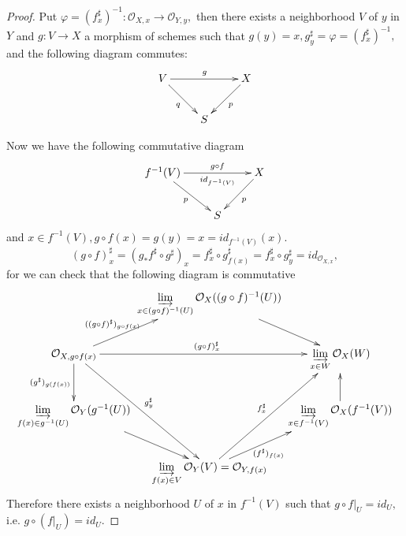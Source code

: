 \begin{proof}
Put $\varphi=(f_x^{\sharp})^{-1}:\mathcal {O}_{X,x}\rightarrow
\mathcal {O}_{Y,y},$ then there exists a neighborhood $V$ of $y$ in
$Y$ and $g: V\rightarrow X$ a morphism of schemes such that $g(y)=x,
g_y^{\sharp}=\varphi=(f_x^{\sharp})^{-1},$ and the following diagram
commutes:
\[ \xymatrix{
   V \ar[rr]^g \ar[dr]_q & & X \ar[dl]^p \\
   & S }  \]

Now we have the following commutative diagram
\[ \xymatrix{
   {f^{-1}(V)} \ar[rr]^-{g\circ f}_-{id_{f^{-1}(V)}} \ar[dr]_p & & X \ar[dl]^p \\
   & S }  \]
and $x\in f^{-1}(V), g\circ f(x)=g(y)=x=id_{f^{-1}(V)}(x).$
$$(g\circ f)_x^{\sharp}=(g_{\ast}f^{\sharp}\circ g^{\sharp})_x=
f_x^{\sharp}\circ g^{\sharp}_{f(x)}=f_x^{\sharp}\circ
g^{\sharp}_y=id_{\mathcal {O}_{X,x}},$$ for we can check that the
following diagram is commutative
\[ \xymatrix@C=0em{
   & {\varinjlim\limits_{x\in (g\circ f)^{-1}(U)}\mathcal {O}_X((g\circ
   f)^{-1}(U))} \ar[dr]                                         \\
   {\mathcal {O}_{X,g\circ f(x)}} \ar[ur]^-{((g\circ f)^{\sharp})_{g\circ
   f(x)}} \ar[d]_-{(g^{\sharp})_{g(f(x))}} \ar"4,2"^-{g^{\sharp}_y}
   \ar[rr]^{(g\circ f)_x^{\sharp}} & & {\varinjlim\limits_{x\in W}\mathcal
   {O}_X(W)}                                                     \\
   {\varinjlim\limits_{f(x)\in g^{-1}(U)}\mathcal {O}_Y(g^{-1}(U))}
   \ar[dr] & & {\varinjlim\limits_{x\in f^{-1}(V)}\mathcal
   {O}_X(f^{-1}(V))} \ar[u]                                      \\
   & {\varinjlim\limits_{f(x)\in V}\mathcal {O}_Y(V)=\mathcal
   {O}_{Y,f(x)}} \ar[ur]_-{(f^{\sharp})_{f(x)}} \ar"2,3"^-{f^{\sharp}_x} } \]
Therefore there exists a neighborhood $U$ of $x$ in $f^{-1}(V)$ such
that $g\circ \left.f\right|_U=id_U,$ i.e. $g\circ
(\left.f\right|_U)=id_U.$


\end{proof}
